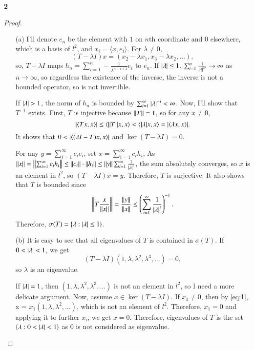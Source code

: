 \documentclass[a4paper, 12pt]{article}
\theoremstyle{Mydefinition}
\theoremstyle{Mytheorem}
\begin{document}
\noindent \textbf{2}
\begin{proof}
\begin{enumerate}
    \item[(a)] I'll denote $e_n$ be the element with $1$ on $n$th coordinate and $0$ elsewhere, which is a basis of $l^2$, and $x_i = \langle x, e_i\rangle$. For $\lambda\neq 0$, 
    \begin{equation}\label{eq:1}
        (T-\lambda I)x = (x_2-\lambda x_1, x_3-\lambda x_2, \ldots),
    \end{equation}
    so, $T-\lambda I$ maps $h_n = \sum_{i=1}^n -\frac{1}{\lambda^{n-i+1}}e_i$ to $e_n$. If $\abs{\lambda}\leq 1$, $\sum_{i=1}^n \frac{1}{\abs{\lambda}^{2i}} \rightarrow \infty$ as $n\rightarrow \infty$, so regardless the existence of the inverse, the inverse is not a bounded operator, so is not invertible. 
    
    If $\abs{\lambda}>1$, the norm of $h_n$ is bounded by $\sum_{i=1}^\infty \abs{\lambda}^{-i}<\infty$. Now, I'll show that $T^{-1}$ exists. 
    First, $T$ is injective because $\norm{T}=1$, so for any $x\neq 0$,
    \begin{equation}
        \abs{\langle Tx, x\rangle} \leq \langle \norm{T}x, x\rangle < \langle \abs{\lambda}x, x\rangle = \abs{\langle \lambda x, x\rangle}.
    \end{equation}
    It shows that $0<\abs{\langle (\lambda I - T)x, x\rangle}$ and $\ker (T-\lambda I) = 0$.

    For any $y = \sum_{i=1}^\infty c_i e_i$, set $x = \sum_{i=1}^\infty c_i h_i$, As $\norm{x} = \norm{\sum_{i=1}^\infty c_i h_i}\leq \norm{c_i}\cdot\norm{h_i}\leq \norm{y}\sum_{i=1}^\infty \frac{1}{\abs{\lambda}^i}$, the sum absolutely converges, so $x$ is an element in $l^2$, so $(T-\lambda I)x = y$. Therefore, $T$ is surjective. It also shows that $T$ is bounded since
    \begin{equation}
        \norm{T\frac{x}{\norm{x}}} = \frac{\norm{y}}{\norm{x}}\leq \left(\sum_{i=1}^\infty \frac{1}{\abs{\lambda}^i}\right)^{-1}.
    \end{equation}    
    Therefore, $\sigma(T) = \{\lambda: \abs{\lambda}\leq 1\}$.

    \item[(b)] It is easy to see that all eigenvalues of $T$ is contained in $\sigma(T)$. If $0<\abs{\lambda}<1$, we get
    \begin{equation}
        (T-\lambda I) (1, \lambda, \lambda^2, \lambda^3, \ldots) = 0,
    \end{equation}
    so $\lambda$ is an eigenvalue. 
    
    If $\abs{\lambda} = 1$, then $(1, \lambda, \lambda^2, \lambda^3, \ldots)$ is not an element in $l^2$, so I need a more delicate argument. Now, assume $x\in \ker (T-\lambda I)$. If $x_1\neq 0$, then by \eqref{eq:1}, x = $x_1(1, \lambda, \lambda^2, \ldots)$, which is not an element of $l^2$. Therefore, $x_1=0$ and applying it to further $x_i$, we get $x = 0$. Therefore, eigenvalues of $T$ is the set $\{\lambda:0<\abs{\lambda}<1\}$ as $0$ is not considered as eigenvalue.
\end{enumerate}
\end{proof}
\end{document}
